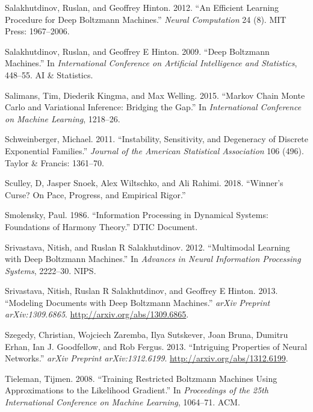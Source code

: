 \documentclass[]{article}
\theoremstyle{definition}
\begin{document}
\leavevmode\hypertarget{ref-salakhutdinov2012efficient}{}%
Salakhutdinov, Ruslan, and Geoffrey Hinton. 2012. ``An Efficient
Learning Procedure for Deep Boltzmann Machines.'' \emph{Neural
Computation} 24 (8). MIT Press: 1967--2006.

\leavevmode\hypertarget{ref-salakhutdinov2009deep}{}%
Salakhutdinov, Ruslan, and Geoffrey E Hinton. 2009. ``Deep Boltzmann
Machines.'' In \emph{International Conference on Artificial Intelligence
and Statistics}, 448--55. AI \& Statistics.

\leavevmode\hypertarget{ref-salimans2015markov}{}%
Salimans, Tim, Diederik Kingma, and Max Welling. 2015. ``Markov Chain
Monte Carlo and Variational Inference: Bridging the Gap.'' In
\emph{International Conference on Machine Learning}, 1218--26.

\leavevmode\hypertarget{ref-schweinberger2011instability}{}%
Schweinberger, Michael. 2011. ``Instability, Sensitivity, and Degeneracy
of Discrete Exponential Families.'' \emph{Journal of the American
Statistical Association} 106 (496). Taylor \& Francis: 1361--70.

\leavevmode\hypertarget{ref-sculley2018winner}{}%
Sculley, D, Jasper Snoek, Alex Wiltschko, and Ali Rahimi. 2018.
``Winner's Curse? On Pace, Progress, and Empirical Rigor.''

\leavevmode\hypertarget{ref-smolensky1986information}{}%
Smolensky, Paul. 1986. ``Information Processing in Dynamical Systems:
Foundations of Harmony Theory.'' DTIC Document.

\leavevmode\hypertarget{ref-srivastava2012multimodal}{}%
Srivastava, Nitish, and Ruslan R Salakhutdinov. 2012. ``Multimodal
Learning with Deep Boltzmann Machines.'' In \emph{Advances in Neural
Information Processing Systems}, 2222--30. NIPS.

\leavevmode\hypertarget{ref-srivastava2013modeling}{}%
Srivastava, Nitish, Ruslan R Salakhutdinov, and Geoffrey E Hinton. 2013.
``Modeling Documents with Deep Boltzmann Machines.'' \emph{arXiv
Preprint arXiv:1309.6865}. \url{http://arxiv.org/abs/1309.6865}.

\leavevmode\hypertarget{ref-szegedy2013intriguing}{}%
Szegedy, Christian, Wojciech Zaremba, Ilya Sutskever, Joan Bruna,
Dumitru Erhan, Ian J. Goodfellow, and Rob Fergus. 2013. ``Intriguing
Properties of Neural Networks.'' \emph{arXiv Preprint arXiv:1312.6199}.
\url{http://arxiv.org/abs/1312.6199}.

\leavevmode\hypertarget{ref-tieleman2008training}{}%
Tieleman, Tijmen. 2008. ``Training Restricted Boltzmann Machines Using
Approximations to the Likelihood Gradient.'' In \emph{Proceedings of the
25th International Conference on Machine Learning}, 1064--71. ACM.
\end{document}
